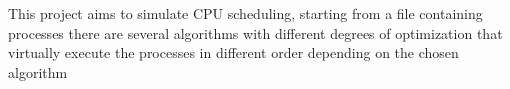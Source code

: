 This project aims to simulate CPU scheduling, starting from a file containing processes there are several algorithms with different degrees of optimization that virtually execute the processes in different order depending on the chosen algorithm 